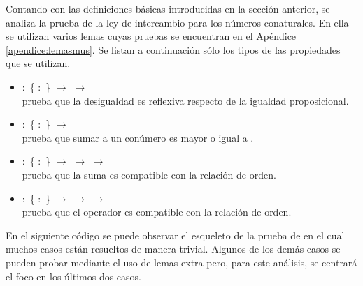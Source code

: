 Contando con las definiciones básicas introducidas en la sección anterior, se analiza la prueba de la ley de intercambio para los números conaturales. En ella se utilizan varios lemas cuyas pruebas se encuentran en el Apéndice \ref{apendice:lemasmus}. Se listan a continuación sólo los tipos de las propiedades que se utilizan. 

\begin{itemize}[noitemsep]
\item \AgdaFunction{$\equiv\Rightarrow\gtrsim$} $:$ \{ $:$ \} $\rightarrow$  \AgdaFunction{$\equiv$}  $\rightarrow$  \AgdaFunction{$\gtrsim$}  \\ prueba que la desigualdad es reflexiva respecto de la igualdad proposicional.

\item {} $:$ \{ $:$ \} $\rightarrow$    \AgdaFunction{$\gtrsim$}  \\ prueba que sumar  a un conúmero  es mayor o igual a .

\item {} $:$ \{ $:$ \} $\rightarrow$  \AgdaFunction{$\gtrsim$}  $\rightarrow$  \AgdaFunction{$\gtrsim$}  $\rightarrow$   \AgdaFunction{$\gtrsim$}   \\ prueba que la suma es compatible con la relación de orden.

\item {} $:$ \{ $:$ \} $\rightarrow$  \AgdaFunction{$\gtrsim$}  $\rightarrow$  \AgdaFunction{$\gtrsim$}  $\rightarrow$   \AgdaFunction{$\gtrsim$}   \\ prueba que el operador  es compatible con la relación de orden.
\end{itemize}

En el siguiente código se puede observar el esqueleto de la prueba de  en el cual muchos casos están resueltos de manera trivial. Algunos de los demás casos se pueden probar mediante el uso de lemas extra pero, para este análisis, se centrará el foco en los últimos dos casos. 

